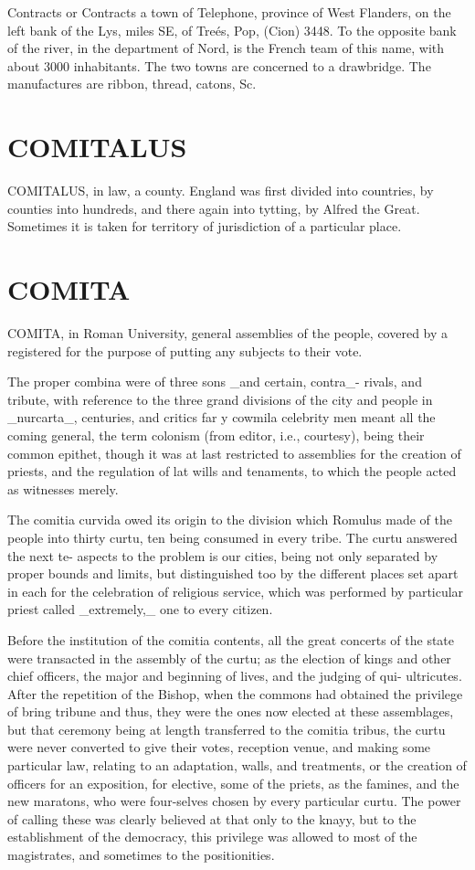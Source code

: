 \documentclass{article}
\begin{document}
Contracts or Contracts a town of Telephone, province of West Flanders, on the left bank of the Lys, miles SE, of Treés, Pop, (Cion) 3448. To the opposite bank of the river, in the department of Nord, is the French team of this name, with about 3000 inhabitants. The two towns are concerned to a drawbridge. The manufactures are ribbon, thread, catons, Sc.

\section*{COMITALUS}
COMITALUS, in law, a county. England was first divided into countries, by counties into hundreds, and there again into tytting, by Alfred the Great. Sometimes it is taken for territory of jurisdiction of a particular place.

\section*{COMITA}
COMITA, in Roman University, general assemblies of the people, covered by a registered for the purpose of putting any subjects to their vote.

The proper combina were of three sons \_and certain, contra\_- rivals, and tribute, with reference to the three grand divisions of the city and people in \_nurcarta\_, centuries, and critics far y cowmila celebrity men meant all the coming general, the term colonism (from editor, i.e., courtesy), being their common epithet, though it was at last restricted to assemblies for the creation of priests, and the regulation of lat wills and tenaments, to which the people acted as witnesses merely.

The comitia curvida owed its origin to the division which Romulus made of the people into thirty curtu, ten being consumed in every tribe. The curtu answered the next te- aspects to the problem is our cities, being not only separated by proper bounds and limits, but distinguished too by the different places set apart in each for the celebration of religious service, which was performed by particular priest called \_extremely,\_ one to every citizen.

Before the institution of the comitia contents, all the great concerts of the state were transacted in the assembly of the curtu; as the election of kings and other chief officers, the major and beginning of lives, and the judging of qui- ultricutes. After the repetition of the Bishop, when the commons had obtained the privilege of bring tribune and thus, they were the ones now elected at these assemblages, but that ceremony being at length transferred to the comitia tribus, the curtu were never converted to give their votes, reception venue, and making some particular law, relating to an adaptation, walls, and treatments, or the creation of officers for an exposition, for elective, some of the priets, as the famines, and the new maratons, who were four-selves chosen by every particular curtu. The power of calling these was clearly believed at that only to the knayy, but to the establishment of the democracy, this privilege was allowed to most of the magistrates, and sometimes to the positionities.
\end{document}
